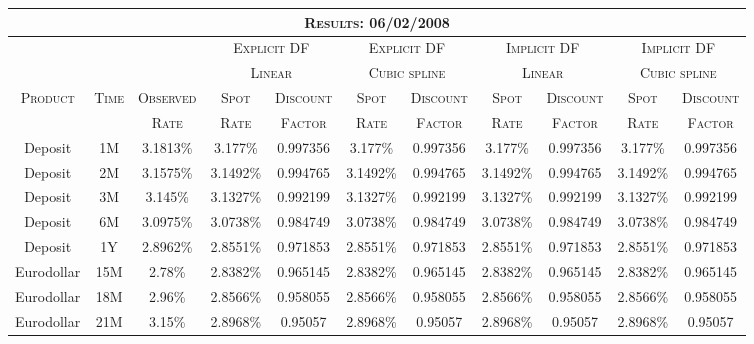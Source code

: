 \begin{landscape}

\begin{table}[ht]
\begin{center}
\begin{tabular}{ccc|cc|cc|cc|cc}

\multicolumn{11}{c}{\textsc{Results: 06/02/2008}} \\
\toprule
 & & & \multicolumn{2}{c}{\textsc{Explicit DF}} & \multicolumn{2}{c}{\textsc{Explicit DF}} & \multicolumn{2}{c}{\textsc{Implicit DF}} & \multicolumn{2}{c}{\textsc{Implicit DF}} \\
 
 & & & \multicolumn{2}{c}{\textsc{Linear}} & \multicolumn{2}{c}{\textsc{Cubic spline}} & \multicolumn{2}{c}{\textsc{Linear}} & \multicolumn{2}{c}{\textsc{Cubic spline}} \\

\toprule
\multirow{2}{*}{\textsc{Product}} & \multirow{2}{*}{\textsc{Time}} & \textsc{Observed} & \textsc{Spot} & \textsc{Discount} & \textsc{Spot} & \textsc{Discount} & \textsc{Spot} & \textsc{Discount} & \textsc{Spot} & \textsc{Discount}\\

 & & \textsc{Rate} & \textsc{Rate} & \textsc{Factor} & \textsc{Rate} & \textsc{Factor} & \textsc{Rate} & \textsc{Factor} & \textsc{Rate} & \textsc{Factor} \\
\toprule

Deposit & 1M & 3.1813\% & 3.177\% & 0.997356 & 3.177\% & 0.997356 & 3.177\% & 0.997356 & 3.177\% & 0.997356 \\
Deposit & 2M & 3.1575\% & 3.1492\% & 0.994765 & 3.1492\% & 0.994765 & 3.1492\% & 0.994765 & 3.1492\% & 0.994765 \\
Deposit & 3M & 3.145\% & 3.1327\% & 0.992199 & 3.1327\% & 0.992199 & 3.1327\% & 0.992199 & 3.1327\% & 0.992199 \\
Deposit & 6M & 3.0975\% & 3.0738\% & 0.984749 & 3.0738\% & 0.984749 & 3.0738\% & 0.984749 & 3.0738\% & 0.984749 \\
Deposit & 1Y & 2.8962\% & 2.8551\% & 0.971853 & 2.8551\% & 0.971853 & 2.8551\% & 0.971853 & 2.8551\% & 0.971853 \\

Eurodollar & 15M & 2.78\% & 2.8382\% & 0.965145 & 2.8382\% & 0.965145 & 2.8382\% & 0.965145 & 2.8382\% & 0.965145 \\
Eurodollar & 18M & 2.96\% & 2.8566\% & 0.958055 & 2.8566\% & 0.958055 & 2.8566\% & 0.958055 & 2.8566\% & 0.958055 \\
Eurodollar & 21M & 3.15\% & 2.8968\% & 0.95057 & 2.8968\% & 0.95057 & 2.8968\% & 0.95057 & 2.8968\% & 0.95057 \\


\end{tabular}
\end{center}
\end{table}
\end{landscape}
